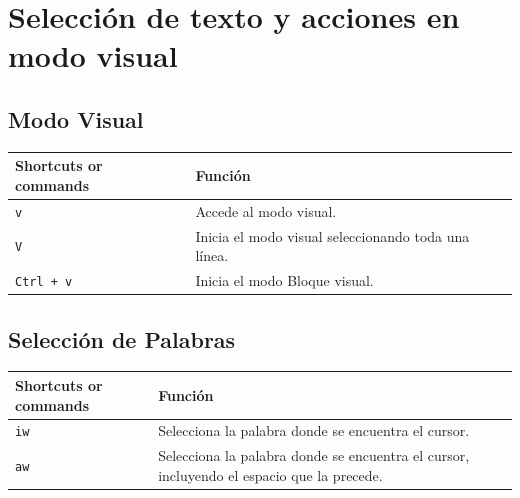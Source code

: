 \documentclass[
  doc,
  floatsintext,
  longtable,
  a4paper,
  nolmodern,
  notxfonts,
  notimes,
  12pt,
  colorlinks=true,linkcolor=blue,citecolor=blue,urlcolor=blue]{apa7}
\newcounter{none} %
\begin{document}
\section{Selección de texto y acciones en modo
visual}\label{selecciuxf3n-de-texto-y-acciones-en-modo-visual}

\subsection{Modo Visual}\label{modo-visual}

{\def\LTcaptype{none} %
\begin{longtable}[]{@{}
  >{\raggedright\arraybackslash}p{}
  >{\raggedright\arraybackslash}p{}@{}}
\toprule\noalign{}
\begin{minipage}[b]{\linewidth}\raggedright
Shortcuts or commands
\end{minipage} & \begin{minipage}[b]{\linewidth}\raggedright
Función
\end{minipage} \\
\midrule\noalign{}
\endhead
\bottomrule\noalign{}
\endlastfoot
\texttt{v} & Accede al modo visual. \\
\texttt{V} & Inicia el modo visual seleccionando toda una línea. \\
\texttt{Ctrl\ +\ v} & Inicia el modo Bloque visual. \\
\end{longtable}
}

\subsection{Selección de Palabras}\label{selecciuxf3n-de-palabras}

{\def\LTcaptype{none} %
\begin{longtable}[]{@{}
  >{\raggedright\arraybackslash}p{}
  >{\raggedright\arraybackslash}p{}@{}}
\toprule\noalign{}
\begin{minipage}[b]{\linewidth}\raggedright
Shortcuts or commands
\end{minipage} & \begin{minipage}[b]{\linewidth}\raggedright
Función
\end{minipage} \\
\midrule\noalign{}
\endhead
\bottomrule\noalign{}
\endlastfoot
\texttt{iw} & Selecciona la palabra donde se encuentra el cursor. \\
\texttt{aw} & Selecciona la palabra donde se encuentra el cursor,
incluyendo el espacio que la precede. \\
\end{longtable}
}
\end{document}
